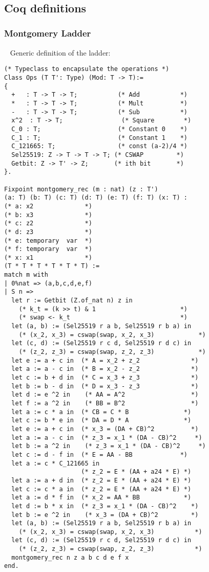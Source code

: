 ~\\
~\\
~\\
\subsection{Coq definitions}
\label{appendix:coq}

\subsubsection{Montgomery Ladder}
\label{subsubsec:coq-ladder}
~
Generic definition of the ladder:

\begin{lstlisting}[language=Coq]
(* Typeclass to encapsulate the operations *)
Class Ops (T T': Type) (Mod: T -> T):=
{
  +   : T -> T -> T;           (* Add           *)
  *   : T -> T -> T;           (* Mult          *)
  -   : T -> T -> T;           (* Sub           *)
  x^2  : T -> T;                (* Square        *)
  C_0 : T;                     (* Constant 0    *)
  C_1 : T;                     (* Constant 1    *)
  C_121665: T;                 (* const (a-2)/4 *)
  Sel25519: Z -> T -> T -> T; (* CSWAP         *)
  Getbit: Z -> T' -> Z;       (* ith bit       *)
}.

Fixpoint montgomery_rec (m : nat) (z : T')
(a: T) (b: T) (c: T) (d: T) (e: T) (f: T) (x: T) :
(* a: x2              *)
(* b: x3              *)
(* c: z2              *)
(* d: z3              *)
(* e: temporary  var  *)
(* f: temporary  var  *)
(* x: x1              *)
(T * T * T * T * T * T) :=
match m with
| 0%nat => (a,b,c,d,e,f)
| S n =>
  let r := Getbit (Z.of_nat n) z in
    (* k_t = (k >> t) & 1                       *)
    (* swap <- k_t                              *)
  let (a, b) := (Sel25519 r a b, Sel25519 r b a) in
    (* (x_2, x_3) = cswap(swap, x_2, x_3)            *)
  let (c, d) := (Sel25519 r c d, Sel25519 r d c) in
    (* (z_2, z_3) = cswap(swap, z_2, z_3)            *)
  let e := a + c in  (* A = x_2 + z_2              *)
  let a := a - c in  (* B = x_2 - z_2              *)
  let c := b + d in  (* C = x_3 + z_3              *)
  let b := b - d in  (* D = x_3 - z_3              *)
  let d := e ^2 in    (* AA = A^2                  *)
  let f := a ^2 in    (* BB = B^2                  *)
  let a := c * a in  (* CB = C * B               *)
  let c := b * e in  (* DA = D * A               *)
  let e := a + c in  (* x_3 = (DA + CB)^2          *)
  let a := a - c in  (* z_3 = x_1 * (DA - CB)^2     *)
  let b := a ^2 in    (* z_3 = x_1 * (DA - CB)^2     *)
  let c := d - f in  (* E = AA - BB             *)
  let a := c * C_121665 in
                     (* z_2 = E * (AA + a24 * E) *)
  let a := a + d in  (* z_2 = E * (AA + a24 * E) *)
  let c := c * a in  (* z_2 = E * (AA + a24 * E) *)
  let a := d * f in  (* x_2 = AA * BB            *)
  let d := b * x in  (* z_3 = x_1 * (DA - CB)^2    *)
  let b := e ^2 in    (* x_3 = (DA + CB)^2         *)
  let (a, b) := (Sel25519 r a b, Sel25519 r b a) in
    (* (x_2, x_3) = cswap(swap, x_2, x_3)           *)
  let (c, d) := (Sel25519 r c d, Sel25519 r d c) in
    (* (z_2, z_3) = cswap(swap, z_2, z_3)           *)
  montgomery_rec n z a b c d e f x
end.


\end{lstlisting}
